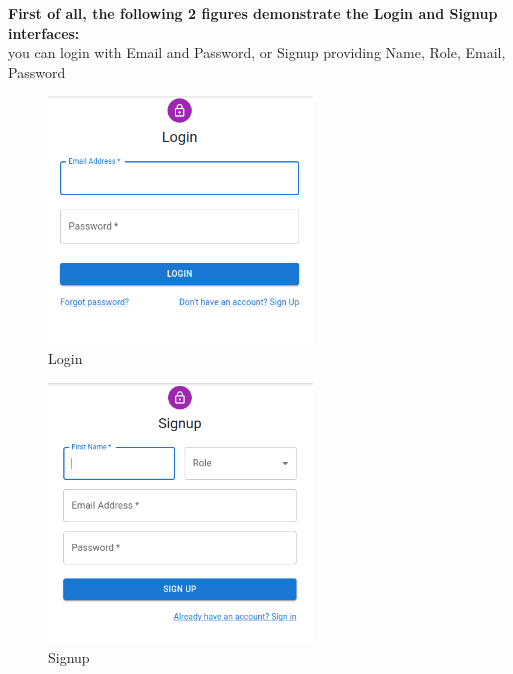         
        \noindent \textbf{First of all, the following 2 figures demonstrate the Login and Signup interfaces:} \\
        you can login with Email and Password, or Signup providing Name, Role, Email, Password
        \begin{figure}[H]
        \begin{center}
        \includegraphics[width=7cm]{./diagnosis-system/presentation-of-app/login.png}
        \end{center}
        \caption{Login}
        \label{fig:}
        \end{figure}

        

        \begin{figure}[H]
        \begin{center}
        \includegraphics[width=7cm]{./diagnosis-system/presentation-of-app/signup.png}
        \end{center}
        \caption{Signup}
        \label{fig:}
        \end{figure}

